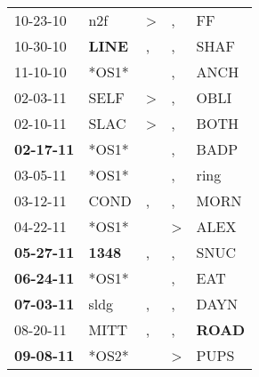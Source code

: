 \begin{supertabular}{p{0.07\textwidth}p{0.06\textwidth}p{0.02\textwidth}p{0.02\textwidth}p{0.06\textwidth}}
          10-23-10\textsuperscript{} &            n2f\textsuperscript{} &     \textgreater &                , &             FF\textsuperscript{} \\
          10-30-10\textsuperscript{} &  \textbf{LINE\textsuperscript{}} &                , &                , &           SHAF\textsuperscript{} \\
          11-10-10\textsuperscript{} &                            *OS1* &                  &                , &           ANCH\textsuperscript{} \\
          02-03-11\textsuperscript{} &           SELF\textsuperscript{} &     \textgreater &                , &           OBLI\textsuperscript{} \\
          02-10-11\textsuperscript{} &           SLAC\textsuperscript{} &     \textgreater &                , &           BOTH\textsuperscript{} \\
 \textbf{02-17-11\textsuperscript{}} &                            *OS1* &                  &                , &           BADP\textsuperscript{} \\
          03-05-11\textsuperscript{} &                            *OS1* &                  &                , &           ring\textsuperscript{} \\
          03-12-11\textsuperscript{} &           COND\textsuperscript{} &                , &                , &           MORN\textsuperscript{} \\
          04-22-11\textsuperscript{} &                            *OS1* &                  &     \textgreater &           ALEX\textsuperscript{} \\
 \textbf{05-27-11\textsuperscript{}} &  \textbf{1348\textsuperscript{}} &                , &                , &           SNUC\textsuperscript{} \\
 \textbf{06-24-11\textsuperscript{}} &                            *OS1* &                  &                , &            EAT\textsuperscript{} \\
 \textbf{07-03-11\textsuperscript{}} &           sldg\textsuperscript{} &                , &                , &           DAYN\textsuperscript{} \\
          08-20-11\textsuperscript{} &           MITT\textsuperscript{} &                , &                , &  \textbf{ROAD\textsuperscript{}} \\
 \textbf{09-08-11\textsuperscript{}} &                            *OS2* &                  &     \textgreater &           PUPS\textsuperscript{} \\

\end{supertabular}
